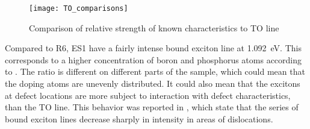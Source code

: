 \begin{figure}[H]
\centering
\texttt{[image: TO\_comparisons]}
\caption[Comparison or relative strength]{Comparison of relative strength of known characteristics to TO line}
\label{fig:TO_comparisons}%

\end{figure}



Compared to R6, ES1 have a fairly intense bound exciton line at 1.092~eV. This corresponds to a higher concentration of boron and phosphorus atoms according to \cite{tajima78}. The ratio is different on different parts of the sample, which could mean that the doping atoms are unevenly distributed. It could also mean that the excitons at defect locations are more subject to interaction with defect characteristics, than the TO line. This behavior was reported in \cite{drozdov76}, which state that the series of bound exciton lines decrease sharply in intensity in areas of dislocations. 